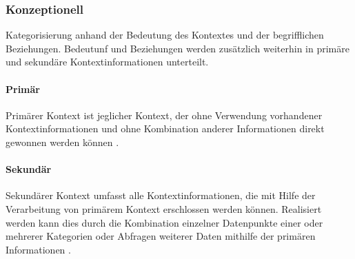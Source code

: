 \subsubsection{Konzeptionell}
Kategorisierung anhand der Bedeutung des Kontextes und der begrifflichen Beziehungen. Bedeutunf und Beziehungen werden zusätzlich weiterhin in primäre und sekundäre Kontextinformationen unterteilt.
\paragraph{Primär}
Primärer Kontext ist jeglicher Kontext, der ohne Verwendung vorhandener Kontextinformationen und ohne Kombination anderer Informationen direkt gewonnen werden können \cite{abowd_towards_1999}. 
\paragraph{Sekundär}
Sekundärer Kontext umfasst alle Kontextinformationen, die mit Hilfe der Verarbeitung von primärem Kontext erschlossen werden können. Realisiert werden kann dies durch die Kombination einzelner Datenpunkte einer oder mehrerer Kategorien oder Abfragen weiterer Daten mithilfe der primären Informationen  \cite{abowd_towards_1999}.
